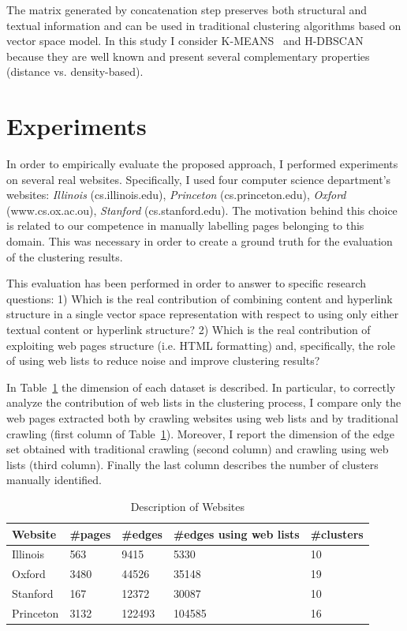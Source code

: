 The matrix generated by concatenation step preserves both structural and textual information and can be used in traditional clustering algorithms based on vector space model. In this study I consider K-MEANS~\cite{Jain:2010} and H-DBSCAN~\cite{Campello:2013} because they are well known and present several complementary properties (distance vs. density-based).


\section{Experiments}
\label{2sec:Experiments}
In order to empirically evaluate the proposed approach, I performed experiments on several real websites. Specifically, I used  four computer science department's websites: \emph{Illinois} (cs.illinois.edu), \emph{Princeton} (cs.princeton.edu), \emph{Oxford} (www.cs.ox.ac.ou), \emph{Stanford} (cs.stanford.edu). The motivation behind this choice is related to our competence in manually labelling pages belonging to this domain. This was necessary in order to create a ground truth for the evaluation of the clustering results. 


This evaluation has been performed in order to answer to specific research questions: 1) Which is the real contribution of combining content and hyperlink structure in a single vector space representation with respect to using only either textual content or hyperlink structure? 2) Which is the real contribution of exploiting web pages structure (i.e. HTML formatting) and, specifically, the role of using web lists to reduce noise and improve clustering results?




In Table~\ref{tab:websites} the dimension of each dataset is described. In particular, to correctly analyze the contribution of web lists in the clustering process, I compare only the web pages extracted both by crawling websites using web lists and by traditional crawling (first column of Table~\ref{tab:websites}). Moreover, I report the dimension of the edge set obtained with traditional crawling (second column) and crawling using web lists (third column). Finally the last column describes the number of clusters manually identified.

\begin{table}[]
\centering
\caption{Description of Websites}
\label{tab:websites}
\begin{tabular}{|l|l|l|l|l|}
\hline
Website  & \#pages & \#edges & \#edges using web lists &\#clusters \\
\hline
\hline
Illinois & 563 & 9415 & 5330 & 10  \\ \hline
Oxford & 3480 & 44526 & 35148 & 19\\ \hline
Stanford  & 167 & 12372 & 30087 & 10\\ \hline
Princeton  &  3132 & 122493 &  104585 & 16 \\ \hline
\end{tabular}
\end{table}

